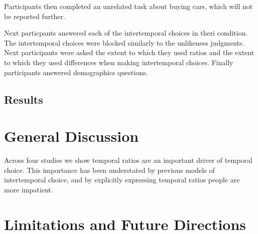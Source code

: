 \documentclass[]{article}
\begin{document}
Participants then completed an unrelated task about buying cars, which will not be reported further.

Next particpants answered each of the intertemporal choices in theri condition. 
The intertemporal choices were blocked similarly to the unlikeness judgments. 
Next participants were asked the extent to which they used ratios and the extent to which they used differences when making intertemporal choices. 
Finally participants answered demographics questions. 

\subsection{Results}

\section{General Discussion}

Across four studies we show temporal ratios are an important driver of temporal choice. 
This importance has been understated by previous models of intertemporal choice, and by explicitly expressing temporal ratios people are more impatient. 


\section{Limitations and Future Directions}



\setlength{\bibleftmargin}{.125in}
\setlength{\bibindent}{-\bibleftmargin}


\end{document}
